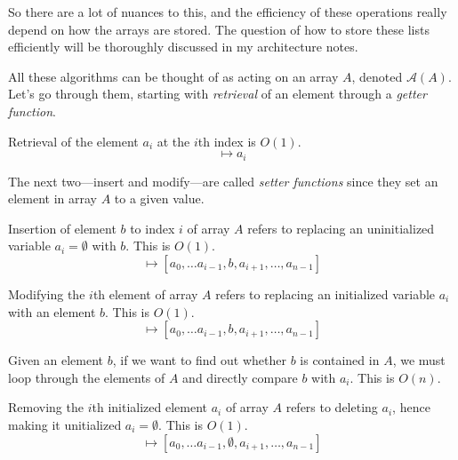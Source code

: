   So there are a lot of nuances to this, and the efficiency of these operations really depend on how the arrays are stored. The question of how to store these lists efficiently will be thoroughly discussed in my architecture notes. 

  All these algorithms can be thought of as acting on an array $A$, denoted $\mathcal{A}(A)$. Let's go through them, starting with \textit{retrieval} of an element through a \textit{getter function}. 

  \begin{algo}
    Retrieval of the element $a_i$ at the $i$th index is $O(1)$.
    \begin{equation}
      [a_0, \ldots a_{i-1}, \emptyset, a_{i+1}, \ldots, a_{n-1}] \mapsto a_i 
    \end{equation}
  \end{algo}

  The next two---insert and modify---are called \textit{setter functions} since they set an element in array $A$ to a given value. 

  \begin{algo} 
    Insertion of element $b$ to index $i$ of array $A$ refers to replacing an uninitialized variable $a_i = \emptyset$ with $b$. This is $O(1)$. 
    \begin{equation}
      [a_0, \ldots a_{i-1}, \emptyset, a_{i+1}, \ldots, a_{n-1}] \mapsto [a_0, \ldots a_{i-1}, b, a_{i+1}, \ldots, a_{n-1}]
    \end{equation}
  \end{algo}
  
  \begin{algo}
    Modifying the $i$th element of array $A$ refers to replacing an initialized variable $a_i$ with an element $b$. This is $O(1)$. 
    \begin{equation}
      [a_1, \ldots a_{i-1}, a_i \neq \emptyset, a_{i+1}, \ldots, a_n] \mapsto [a_0, \ldots a_{i-1}, b, a_{i+1}, \ldots, a_{n-1}]
    \end{equation}
  \end{algo}

  \begin{algo}
    Given an element $b$, if we want to find out whether $b$ is contained in $A$, we must loop through the elements of $A$ and directly compare $b$ with $a_i$. This is $O(n)$. 
  \end{algo}

  \begin{algo}
    Removing the $i$th initialized element $a_i$ of array $A$ refers to deleting $a_i$, hence making it unitialized $a_i = \emptyset$. This is $O(1)$. 
    \begin{equation}
      [a_0, \ldots a_{i-1}, a_i, a_{i+1}, \ldots, a_{n-1}] \mapsto [a_0, \ldots a_{i-1}, \emptyset, a_{i+1}, \ldots, a_{n-1}]
    \end{equation}
  \end{algo} 

